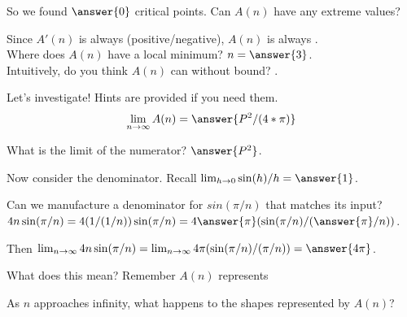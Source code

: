 \documentclass[handout,nooutcomes]{ximera}
\begin{document}
So we found $\answer{0}$ critical points. Can $A(n)$ have any extreme values?\\
\begin{multipleChoice}
\end{multipleChoice}
Since $A'(n)$ is always (positive/negative), $A(n)$ is always .\\
Where does $A(n)$ have a local minimum? $n = \answer{3}$.\\
Intuitively, do you think $A(n)$ can  without bound? .\\ %

\medskip

\begin{exercise}
Let's investigate! Hints are provided if you need them.\\
\[\lim_{n \to \infty}A(n) = \answer{P^2/(4*\pi)}\]
\begin{hint}
	What is the limit of the numerator? $\answer{P^2}$.
\end{hint}
\begin{hint}
  Now consider the denominator. Recall $\lim_{h \to 0} \sin(h)/h = \answer{1}$.
\end{hint}
\begin{hint}
  Can we manufacture a denominator for $sin(\pi/n)$ that matches its input?\\
  $4n\sin(\pi/n) = 4(1/(1/n))\sin(\pi/n) = 4\answer{\pi}(\sin(\pi/n)/(\answer{\pi}/n))$.
\end{hint}
\begin{hint}
  Then $\lim_{n \to \infty} 4n\sin(\pi/n) = \lim_{n \to \infty} 4\pi(\sin(\pi/n)/(\pi/n)) = \answer{4\pi}$.
\end{hint}
\end{exercise}

What does this mean? Remember $A(n)$ represents\\
\begin{multipleChoice}
\end{multipleChoice}
\begin{freeResponse}
As $n$ approaches infinity, what happens to the shapes represented by $A(n)$?
\end{freeResponse}
\end{document}
